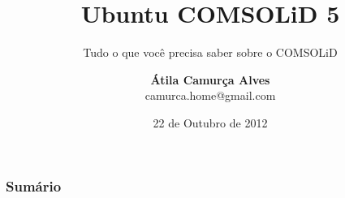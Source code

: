 \documentclass[10pt]{beamer}
\begin{document}
\title{Ubuntu COMSOLiD 5}
\subtitle{Tudo o que você precisa saber sobre o COMSOLiD}
\author{\textbf{Átila Camurça Alves} \\ camurca.home@gmail.com}
\date{22 de Outubro de 2012}
\begin{frame}
\titlepage
\end{frame}

\begin{frame}\frametitle{Sumário}
\tableofcontents
\end{frame}


\end{document}
